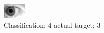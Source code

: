 \begin{figure}[h!]
\begin{center}
\includegraphics[width=0.60\columnwidth]{figures/ID287_class_4_target_3.png}
\end{center}
\caption{ Classification: 4 actual target: 3}
\label{fig:ID287_class_4_target_3}
\end{figure}
